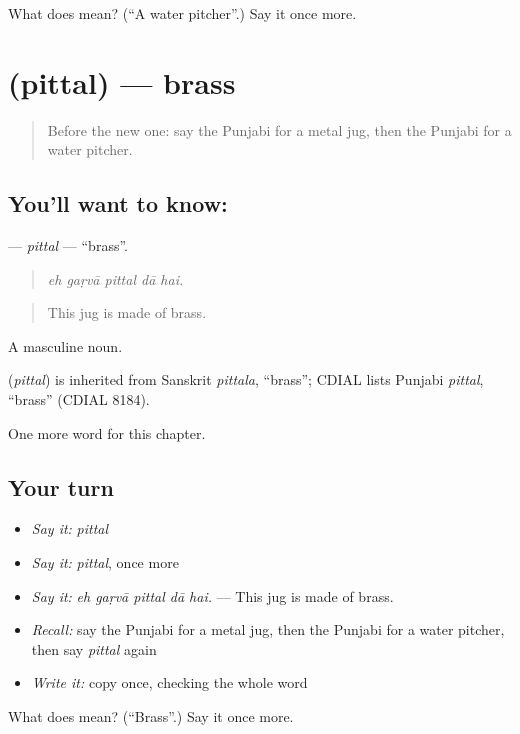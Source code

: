 \begin{tcolorbox}[breakable,colback=teal!4,colframe=teal!35!black,title={Before you move on}]
What does  mean? (\textquotedblleft{}A water pitcher\textquotedblright{}.) Say it once more.
\end{tcolorbox}
\section[\texorpdfstring{\pa{ਪਿੱਤਲ} (pittal)}{ਪਿੱਤਲ (pittal)}]{ (pittal) — brass}

\label{lesson:PA-C250-pittal}



\begin{quote}
Before the new one: say the Punjabi for a metal jug, then the Punjabi for a water pitcher.
\end{quote}

\subsection*{You'll want to know: }
\textbf{} — \emph{pittal} — \textquotedblleft{}brass\textquotedblright{}.

\begin{quote}
    
\end{quote}

\begin{quote}
\emph{eh gaṛvā pittal dā hai.}
\end{quote}

\begin{quote}
This jug is made of brass.
\end{quote}

A masculine noun.

\begin{cousinweb}
\textbf{} (\emph{pittal}) is inherited from Sanskrit \emph{pittala}, \textquotedblleft{}brass\textquotedblright{}; CDIAL lists Punjabi \emph{pittal}, \textquotedblleft{}brass\textquotedblright{} (CDIAL 8184).
\end{cousinweb}

\begin{grammarlens}[title={What you've built}]
One more word for this chapter.
\end{grammarlens}

\subsection*{Your turn}
\begin{itemize}
\raggedright
  \item \emph{Say it:} \emph{pittal}
  \item \emph{Say it:} \emph{pittal}, once more
  \item \emph{Say it:} \emph{eh gaṛvā pittal dā hai.} — This jug is made of brass.
  \item \emph{Recall:} say the Punjabi for a metal jug, then the Punjabi for a water pitcher, then say \emph{pittal} again
  \item \emph{Write it:} copy \textbf{} once, checking the whole word
\end{itemize}

\begin{tcolorbox}[breakable,colback=teal!4,colframe=teal!35!black,title={Before you move on}]
What does  mean? (\textquotedblleft{}Brass\textquotedblright{}.) Say it once more.
\end{tcolorbox}
